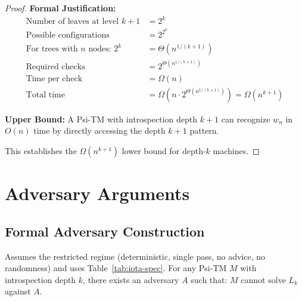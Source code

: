\begin{proof}
\textbf{Formal Justification:}
\begin{align*}
\text{Number of leaves at level } k+1 &= 2^k \\
\text{Possible configurations} &= 2^{2^k} \\
\text{For trees with } n \text{ nodes: } 2^k &= \Theta(n^{1/(k+1)}) \\
\text{Required checks} &= 2^{\Theta(n^{1/(k+1)})} \\
\text{Time per check} &= \Omega(n) \\
\text{Total time} &= \Omega(n \cdot 2^{\Theta(n^{1/(k+1)})}) = \Omega(n^{k+1})
\end{align*}

\textbf{Upper Bound:}
A Psi-TM with introspection depth $k+1$ can recognize $w_n$ in $O(n)$ time by directly accessing the depth $k+1$ pattern.

This establishes the $\Omega(n^{k+1})$ lower bound for depth-$k$ machines.
\end{proof}

\section{Adversary Arguments}

\subsection{Formal Adversary Construction}

\begin{theorem}
\label{thm:adversary-lower-bound-1}
Assumes the restricted regime (deterministic, single pass, no advice, no randomness) and uses Table~\ref{tab:iota-spec}.
For any Psi-TM $M$ with introspection depth $k$, there exists an adversary $A$ such that:
$M$ cannot solve $L_k$ against $A$.
\end{theorem}

